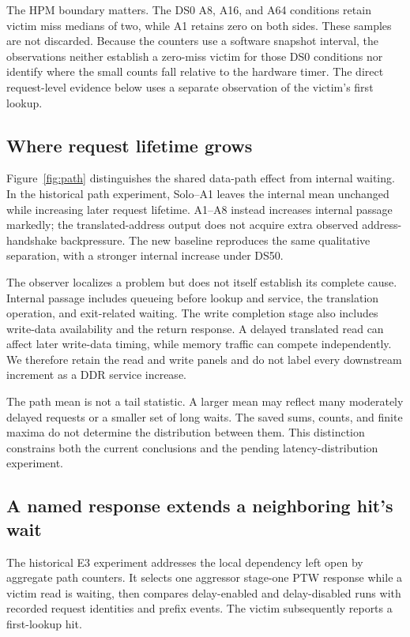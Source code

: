 The HPM boundary matters. The DS0 A8, A16, and A64 conditions retain victim miss medians of two, while A1 retains zero on both sides. These samples are not discarded. Because the counters use a software snapshot interval, the observations neither establish a zero-miss victim for those DS0 conditions nor identify where the small counts fall relative to the hardware timer. The direct request-level evidence below uses a separate observation of the victim's first lookup.

\subsection{Where request lifetime grows}
Figure~\ref{fig:path} distinguishes the shared data-path effect from internal waiting. In the historical path experiment, Solo--A1 leaves the internal mean unchanged while increasing later request lifetime. A1--A8 instead increases internal passage markedly; the translated-address output does not acquire extra observed address-handshake backpressure. The new baseline reproduces the same qualitative separation, with a stronger internal increase under DS50.

The observer localizes a problem but does not itself establish its complete cause. Internal passage includes queueing before lookup and service, the translation operation, and exit-related waiting. The write completion stage also includes write-data availability and the return response. A delayed translated read can affect later write-data timing, while memory traffic can compete independently. We therefore retain the read and write panels and do not label every downstream increment as a DDR service increase.

The path mean is not a tail statistic. A larger mean may reflect many moderately delayed requests or a smaller set of long waits. The saved sums, counts, and finite maxima do not determine the distribution between them. This distinction constrains both the current conclusions and the pending latency-distribution experiment.

\subsection{A named response extends a neighboring hit's wait}
The historical E3 experiment addresses the local dependency left open by aggregate path counters. It selects one aggressor stage-one PTW response while a victim read is waiting, then compares delay-enabled and delay-disabled runs with recorded request identities and prefix events. The victim subsequently reports a first-lookup hit.

